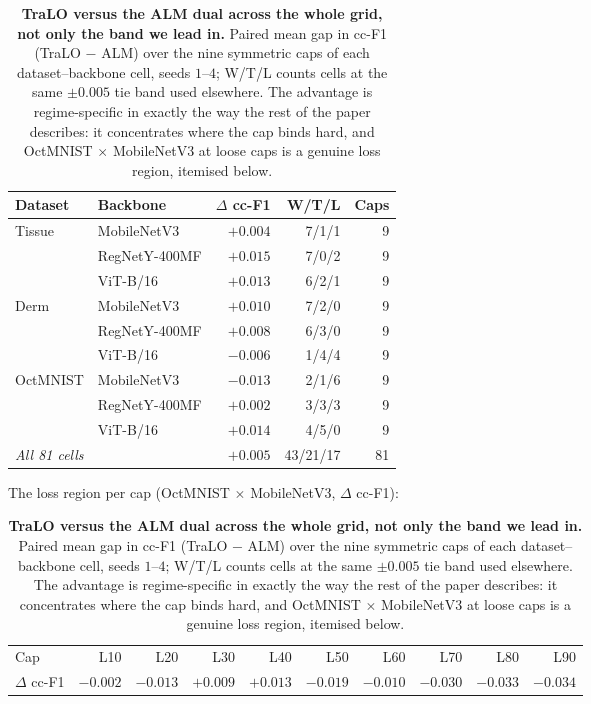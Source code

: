 \begin{table}[t]\centering\small
\caption{{\textbf{TraLO versus the ALM dual across the whole grid, not only the band we lead in.} Paired mean gap in cc-F1 (TraLO $-$ ALM) over the nine symmetric caps of each dataset--backbone cell, seeds $1$--$4$; W/T/L counts cells at the same $\pm0.005$ tie band used elsewhere. The advantage is regime-specific in exactly the way the rest of the paper describes: it concentrates where the cap binds hard, and OctMNIST $\times$ MobileNetV3 at loose caps is a genuine loss region, itemised below.}}
\label{tab:alm_regime}
\begin{tabular}{ll rr r}
\toprule
Dataset & Backbone & $\Delta$ cc-F1 & W/T/L & Caps \\
\midrule
Tissue & MobileNetV3 & $+0.004$ & 7/1/1 & 9 \\
 & RegNetY-400MF & $+0.015$ & 7/0/2 & 9 \\
 & ViT-B/16 & $+0.013$ & 6/2/1 & 9 \\
\midrule
Derm & MobileNetV3 & $+0.010$ & 7/2/0 & 9 \\
 & RegNetY-400MF & $+0.008$ & 6/3/0 & 9 \\
 & ViT-B/16 & $-0.006$ & 1/4/4 & 9 \\
\midrule
OctMNIST & MobileNetV3 & $-0.013$ & 2/1/6 & 9 \\
 & RegNetY-400MF & $+0.002$ & 3/3/3 & 9 \\
 & ViT-B/16 & $+0.014$ & 4/5/0 & 9 \\
\midrule
\multicolumn{2}{l}{\emph{All 81 cells}} & $+0.005$ & 43/21/17 & 81 \\
\bottomrule
\end{tabular}
\vspace{4pt}
{\footnotesize The loss region per cap (OctMNIST $\times$ MobileNetV3, $\Delta$ cc-F1):}
\vspace{2pt}
{\footnotesize\begin{tabular}{lrrrrrrrrr}
\toprule
Cap & L10 & L20 & L30 & L40 & L50 & L60 & L70 & L80 & L90 \\
$\Delta$ cc-F1 & $-0.002$ & $-0.013$ & $+0.009$ & $+0.013$ & $-0.019$ & $-0.010$ & $-0.030$ & $-0.033$ & $-0.034$ \\
\bottomrule
\end{tabular}}
\end{table}
